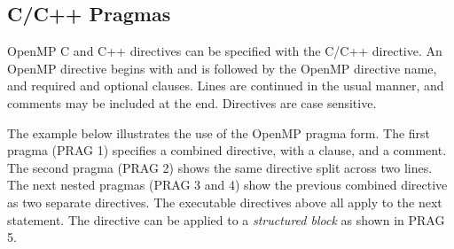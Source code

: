\begin{ccppspecific}[4ex]
\section{C/C++ Pragmas}
\label{sec:pragmas}

OpenMP C and C++ directives can be specified with the C/C++  directive.
An OpenMP directive begins with  and is followed by the 
OpenMP directive name, and required and optional clauses. Lines are continued in the 
usual manner, and comments may be included at the end.
Directives are case sensitive.

The example below illustrates the use of the OpenMP pragma form.
The first pragma (PRAG 1) specifies a combined  
directive, with a  clause, and a comment. 
The second pragma (PRAG 2) shows the same directive split
across two lines. The next nested pragmas (PRAG 3 and 4) show the previous combined directive as 
two separate directives. The executable directives above all apply to the next 
statement. The  directive can be applied to a \emph{structured block}
as shown in PRAG 5.

\end{ccppspecific}
